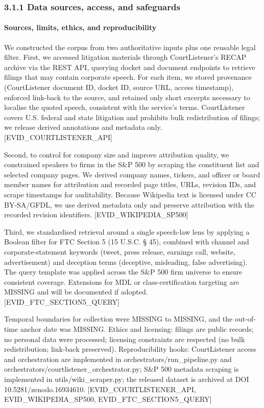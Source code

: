 \subsubsection{3.1.1 Data sources, access, and safeguards}\label{data-sources-access-and-safeguards}

\paragraph{Sources, limits, ethics, and reproducibility}\label{sources-limits-ethics-and-reproducibility}

We constructed the corpus from two authoritative inputs plus one reusable legal filter. First, we accessed litigation materials through CourtListener's RECAP archive via the REST API, querying docket and document endpoints to retrieve filings that may contain corporate speech. For each item, we stored provenance (CourtListener document ID, docket ID, source URL, access timestamp), enforced link-back to the source, and retained only short excerpts necessary to localise the quoted speech, consistent with the service's terms. CourtListener covers U.S. federal and state litigation and prohibits bulk redistribution of filings; we release derived annotations and metadata only. {[}EVID\_COURTLISTENER\_API{]}

Second, to control for company size and improve attribution quality, we constrained speakers to firms in the S\&P 500 by scraping the constituent list and selected company pages. We derived company names, tickers, and officer or board member names for attribution and recorded page titles, URLs, revision IDs, and scrape timestamps for auditability. Because Wikipedia text is licensed under CC BY-SA/GFDL, we use derived metadata only and preserve attribution with the recorded revision identifiers. {[}EVID\_WIKIPEDIA\_SP500{]}

Third, we standardised retrieval around a single speech-law lens by applying a Boolean filter for FTC Section 5 (15 U.S.C. § 45), combined with channel and corporate-statement keywords (tweet, press release, earnings call, website, advertisement) and deception terms (deceptive, misleading, false advertising). The query template was applied across the S\&P 500 firm universe to ensure consistent coverage. Extensions for MDL or class-certification targeting are MISSING and will be documented if adopted. {[}EVID\_FTC\_SECTION5\_QUERY{]}

Temporal boundaries for collection were MISSING to MISSING, and the out-of-time anchor date was MISSING. Ethics and licensing: filings are public records; no personal data were processed; licensing constraints are respected (no bulk redistribution; link-back preserved). Reproducibility hooks: CourtListener access and orchestration are implemented in orchestrators/run\_pipeline.py and orchestrators/courtlistener\_orchestrator.py; S\&P 500 metadata scraping is implemented in utils/wiki\_scraper.py; the released dataset is archived at DOI 10.5281/zenodo.16934610. {[}EVID\_COURTLISTENER\_API, EVID\_WIKIPEDIA\_SP500, EVID\_FTC\_SECTION5\_QUERY{]}
